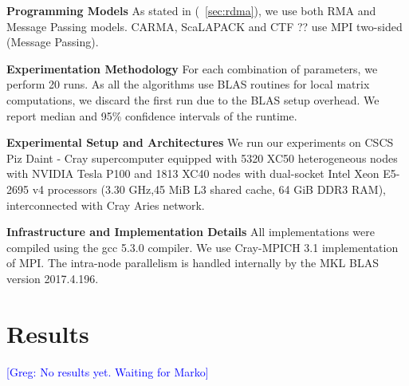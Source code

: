 \documentclass[sigplan,review,anonymous,10pt]{acmart}\settopmatter{printfolios=true,printccs=false,printacmref=false}
\newcommand\greg[1]{\textcolor{blue}{[Greg: #1]}}
\newcommand\mac[1]{\textcolor{red}{[Mac: #1]}}
\newcommand{\macb}[1]{\textbf{\textsf{#1}}}
\begin{document}
\macb{Programming Models}
%
As stated in (~\cref{sec:rdma}), we use both RMA and Message Passing models. 
CARMA, ScaLAPACK and CTF ?? use MPI two-sided (Message Passing).

\macb{Experimentation Methodology}
%
For each combination of parameters, we perform 20 runs. As all the algorithms 
use BLAS routines for local matrix computations, we discard the first run due 
to the BLAS setup overhead. We report median and 95\% confidence intervals of 
the runtime.

\macb{Experimental Setup and Architectures}
%
We run our experiments on CSCS Piz Daint - Cray supercomputer equipped with
5320 XC50 heterogeneous nodes with NVIDIA Tesla P100 and 1813 XC40 nodes with
dual-socket Intel Xeon E5-2695 v4 processors (3.30 GHz,45 MiB L3 shared cache, 
64 GiB DDR3 RAM),
interconnected with Cray Aries network.

\macb{Infrastructure and Implementation Details}
%
All implementations were compiled using the gcc 5.3.0 compiler. We use 
Cray-MPICH 3.1 implementation of MPI. The intra-node parallelism is handled 
internally by the MKL BLAS version 2017.4.196. 

\section{Results}
\label{sec:results}
\greg{No results yet. Waiting for Marko}



\end{document}
